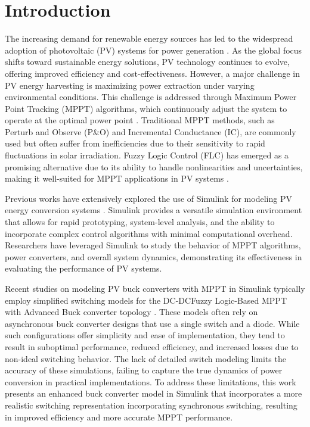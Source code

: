 \documentclass[conference]{IEEEtran}
\begin{document}
\section{Introduction}
The increasing demand for renewable energy sources has led to the widespread adoption of photovoltaic (PV) systems for power generation \cite{pvbook}. As the global focus shifts toward sustainable energy solutions, PV technology continues to evolve, offering improved efficiency and cost-effectiveness. However, a major challenge in PV energy harvesting is maximizing power extraction under varying environmental conditions. This challenge is addressed through Maximum Power Point Tracking (MPPT) algorithms, which continuously adjust the system to operate at the optimal power point \cite{mpptpavia}. Traditional MPPT methods, such as Perturb and Observe (P\&O) and Incremental Conductance (IC), are commonly used but often suffer from inefficiencies due to their sensitivity to rapid fluctuations in solar irradiation. Fuzzy Logic Control (FLC) has emerged as a promising alternative due to its ability to handle nonlinearities and uncertainties, making it well-suited for MPPT applications in PV systems \cite{zadeh1965fuzzy}.

Previous works have extensively explored the use of Simulink for modeling PV energy conversion systems \cite{simulink2024}. Simulink provides a versatile simulation environment that allows for rapid prototyping, system-level analysis, and the ability to incorporate complex control algorithms with minimal computational overhead. Researchers have leveraged Simulink to study the behavior of MPPT algorithms, power converters, and overall system dynamics, demonstrating its effectiveness in evaluating the performance of PV systems.

Recent studies on modeling PV buck converters with MPPT in Simulink typically employ simplified switching models for the DC-DCFuzzy Logic-Based MPPT with Advanced Buck converter topology \cite{recent1robles2017fuzzy, recent2iqbal2016msu, recent3sathya2013modelling,recent4,recent5}. These models often rely on asynchronous buck converter designs that use a single switch and a diode. While such configurations offer simplicity and ease of implementation, they tend to result in suboptimal performance, reduced efficiency, and increased losses due to non-ideal switching behavior. The lack of detailed switch modeling limits the accuracy of these simulations, failing to capture the true dynamics of power conversion in practical implementations. To address these limitations, this work presents an enhanced buck converter model in Simulink that incorporates a more realistic switching representation incorporating synchronous switching, resulting in improved efficiency and more accurate MPPT performance.
\end{document}
